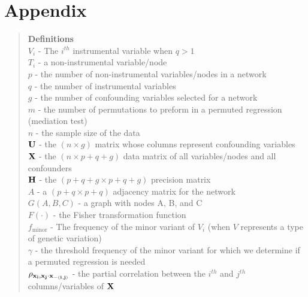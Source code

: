 \documentclass[12pt]{report}
\begin{document}
\newpage
\section*{Appendix}
\begin{quote}
\textbf{Definitions}\\
$V_i$ - The $i^{th}$ instrumental variable when $q > 1$\\
$T_i$ - a non-instrumental variable/node\\
$p$ - the number of non-instrumental variables/nodes in a network\\
$q$ - the number of instrumental variables\\
$g$ - the number of confounding variables selected for a network\\
$m$ - the number of permutations to preform in a permuted regression (mediation test)\\
$n$ - the sample size of the data\\
$\bf U$ - the $(n \times g)$ matrix whose columns represent confounding variables\\
$\bf X$ - the $(n \times p+q+g)$ data matrix of all variables/nodes and all confounders\\
$\bf H$ - the $(p+q+g \times p+q+g)$ precision matrix \\
$A$ - a $(p+q \times p+q)$ adjacency matrix for the network  \\
$G(A,B,C)$ - a graph with nodes A, B, and C\\
$F(\cdot)$ - the Fisher transformation function\\
$f_{\text{minor}}$ - The frequency of the minor variant of $V_i$ (when $V$ represents a type of genetic variation)\\
$\gamma$ - the threshold frequency of the minor variant for which we determine if a permuted regression is needed\\
$\rho_{\bf x_i,x_j\cdot x_{ -(i,j)}  }$ - the partial correlation between the $i^{th}$ and $j^{th}$ columns/variables of ${\bf X}$
\end{quote}
\end{document}
